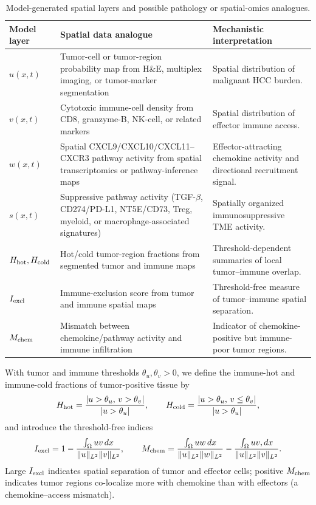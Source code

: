 \documentclass[]{interact}
\theoremstyle{plain}%
\theoremstyle{definition}
\theoremstyle{remark}
\newcommand{\Om}{\Omega}
\begin{document}
\begin{table}[htbp]
\centering
\caption{Model-generated spatial layers and possible pathology or spatial-omics
analogues.}
\label{tab:model_data_mapping}
\renewcommand{\arraystretch}{1.25}
\begin{tabular}{p{}p{}p{}}
\toprule
\textbf{Model layer} & \textbf{Spatial data analogue} & \textbf{Mechanistic interpretation}\\
\midrule
$u(x,t)$ &
Tumor-cell or tumor-region probability map from H\&E, multiplex imaging, or
tumor-marker segmentation &
Spatial distribution of malignant HCC burden.\\
$v(x,t)$ &
Cytotoxic immune-cell density from CD8, granzyme-B, NK-cell, or related markers &
Spatial distribution of effector immune access.\\
$w(x,t)$ &
Spatial CXCL9/CXCL10/CXCL11--CXCR3 pathway activity from spatial transcriptomics
or pathway-inference maps &
Effector-attracting chemokine activity and directional recruitment signal.\\
$s(x,t)$ &
Suppressive pathway activity (TGF-$\beta$, CD274/PD-L1, NT5E/CD73, Treg, myeloid,
or macrophage-associated signatures) &
Spatially organized immunosuppressive TME activity.\\
$H_{\rm hot},H_{\rm cold}$ &
Hot/cold tumor-region fractions from segmented tumor and immune maps &
Threshold-dependent summaries of local tumor--immune overlap.\\
$I_{\rm excl}$ &
Immune-exclusion score from tumor and immune spatial maps &
Threshold-free measure of tumor--immune spatial separation.\\
$M_{\rm chem}$ &
Mismatch between chemokine/pathway activity and immune infiltration &
Indicator of chemokine-positive but immune-poor tumor regions.\\
\bottomrule
\end{tabular}
\end{table}

With tumor and immune thresholds $\theta_u,\theta_v>0$, we define the immune-hot
and immune-cold fractions of tumor-positive tissue by
\begin{equation}
H_{\rm hot}=\frac{|{u>\theta_u,\,v>\theta_v}|}{|{u>\theta_u}|},\qquad
H_{\rm cold}=\frac{|{u>\theta_u,\,v\le\theta_v}|}{|{u>\theta_u}|},
\end{equation}
and introduce the threshold-free indices
\begin{equation}
I_{\rm excl}=1-\frac{\int_\Om uv\,dx}{\|u\|_{L^2}\|v\|_{L^2}},\qquad
M_{\rm chem}=\frac{\int_\Om uw\,dx}{\|u\|_{L^2}\|w\|_{L^2}}
-\frac{\int_\Om uv,dx}{\|u\|_{L^2}\|v\|_{L^2}}.
\end{equation}
Large $I_{\rm excl}$ indicates spatial separation of tumor and effector cells;
positive $M_{\rm chem}$ indicates tumor regions co-localize more with chemokine
than with effectors (a chemokine--access mismatch).
\end{document}
